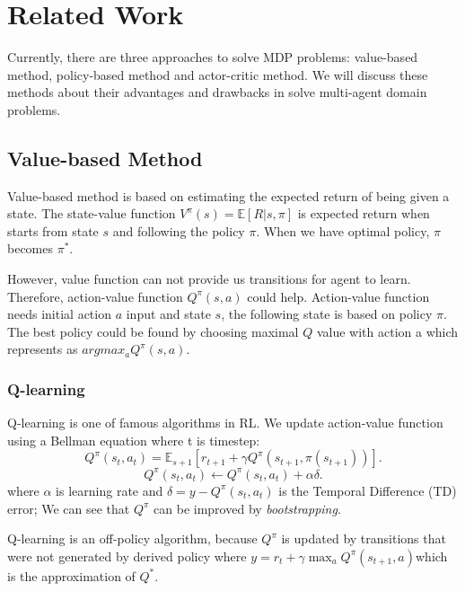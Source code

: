 \documentclass[11pt,twocolumn]{jarticle} %
\begin{document}
\section{Related Work}

Currently, there are three approaches to solve MDP problems: value-based method, policy-based method and actor-critic method. We will discuss these methods about their advantages and drawbacks in solve multi-agent domain problems.

\subsection{Value-based Method}

Value-based method is based on estimating the expected return of being given a state. The state-value function $V^\pi(s) = \mathbb{E}[R|s, \pi]$ is expected return when starts from state $s$ and following the policy $\pi$. When we have optimal policy, $\pi$ becomes $\pi^*$. \par
However, value function can not provide us transitions for agent to learn. Therefore, action-value function $Q^\pi(s, a)$ could help. Action-value function needs initial action $a$ input and state $s$, the following state is based on policy $\pi$. The best policy could be found by choosing maximal $Q$ value with action a which represents as $argmax_a Q^\pi(s, a)$. 

\subsubsection{Q-learning}

Q-learning is one of famous algorithms in RL. We update action-value function using a Bellman equation where t is timestep: 
\begin{equation}
Q^\pi(s_t, a_t) = \mathbb{E}_{s+1}[r_{t+1} + \gamma Q^\pi(s_{t+1}, \pi(s_{t+1}))].  
\end{equation}
\begin{equation}
Q^\pi(s_t, a_t) \leftarrow Q^\pi(s_t, a_t) + \alpha\delta.  
\end{equation}
where $\alpha$ is learning rate and $\delta = y - Q^\pi(s_t, a_t)$ is the Temporal Difference (TD) error; We can see that $Q^\pi$ can be improved by \textsl{bootstrapping}.\par 
Q-learning is an off-policy algorithm, because $Q^\pi$ is updated by transitions that were not generated by derived policy where $y = r_t + \gamma\max_a Q^\pi(s_{t+1}, a)$which is the approximation of $Q^*$.
\end{document}
